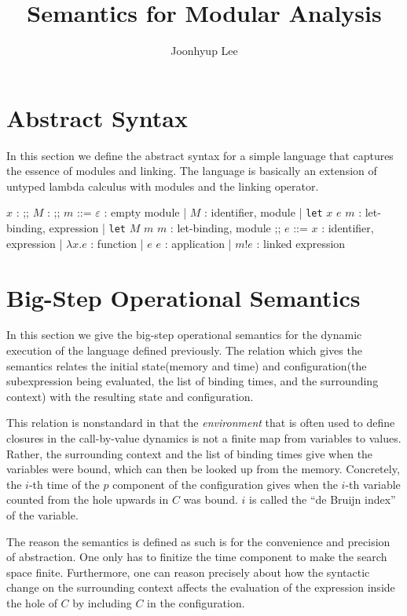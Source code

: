 \documentclass{article}
\title{Semantics for Modular Analysis}
\author{Joonhyup Lee}
\date{}
\newcommand*{\ExprVar}{\mathit{ExprVar}}
\newcommand*{\ModVar}{\mathit{ModVar}}
\newcommand*{\link}[2]{{#1}\mathtt{!}{#2}}
\begin{document}
\maketitle

\section{Abstract Syntax}

In this section we define the abstract syntax for a simple language that captures the essence of modules and linking.
The language is basically an extension of untyped lambda calculus with modules and the linking operator.

\begin{bnfgrammar}
  $x$ : \in \ExprVar
  ;;
  $M$ : \in \ModVar
  ;;
  $m$ ::= $\varepsilon$ : empty module
  | $M$ : identifier, module
  | \texttt{let} $x$ $e$ $m$ : let-binding, expression
  | \texttt{let} $M$ $m$ $m$ : let-binding, module
  ;;
  $e$ ::= $x$ : identifier, expression
  | $\lambda x.e$ : function
  | $e$ $e$ : application
  | $\link{m}{e}$ : linked expression
\end{bnfgrammar}

\section{Big-Step Operational Semantics}

In this section we give the big-step operational semantics for the dynamic execution of the language defined previously.
The relation which gives the semantics relates the initial state(memory and time) and configuration(the subexpression being evaluated, the list of binding times, and the surrounding context) with the resulting state and configuration.

This relation is nonstandard in that the \textit{environment} that is often used to define closures in the call-by-value dynamics is not a finite map from variables to values.
Rather, the surrounding context and the list of binding times give when the variables were bound, which can then be looked up from the memory.
Concretely, the $i$-th time of the $p$ component of the configuration gives when the $i$-th variable counted from the hole upwards in $C$ was bound.
$i$ is called the ``de Bruijn index'' of the variable.

The reason the semantics is defined as such is for the convenience and precision of abstraction.
One only has to finitize the time component to make the search space finite.
Furthermore, one can reason precisely about how the syntactic change on the surrounding context affects the evaluation of the expression inside the hole of $C$ by including $C$ in the configuration.
\end{document}
